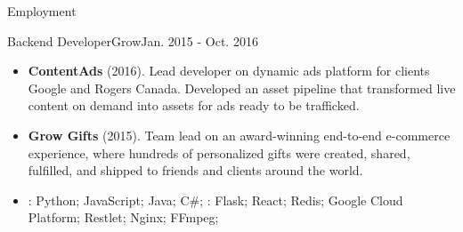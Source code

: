 \documentclass[]{mcdowellcv}
\begin{document}
\begin{cvsection}{Employment}
        \begin{cvsubsection}{Backend Developer}{Grow}{Jan. 2015 - Oct. 2016}
            \begin{itemize}
                \item \textbf{ContentAds} (2016). Lead developer on dynamic ads platform for clients Google and Rogers Canada. Developed an asset pipeline that transformed live content on demand into assets for ads ready to be trafficked.
            \end{itemize}
            \begin{itemize}
                \item \textbf{Grow Gifts} (2015). Team lead on an award-winning end-to-end e-commerce experience, where hundreds of personalized gifts were created, shared, fulfilled, and shipped to friends and clients around the world.
            \end{itemize}
            \begin{itemize}
                 \item {}: Python; JavaScript; Java; C\#; \newline
                : Flask; React; Redis; Google Cloud Platform; Restlet; Nginx; FFmpeg;
            \end{itemize}
        \end{cvsubsection}

    \end{cvsection}
\end{document}
